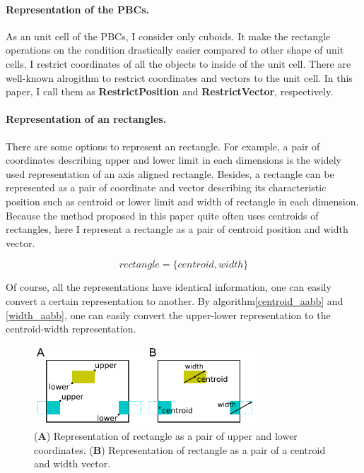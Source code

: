 \documentclass[10pt,letterpaper,twocolumn]{article}
\begin{document}
\paragraph{Representation of the PBCs.}
As an unit cell of the PBCs, I consider only cuboids.
It make the rectangle operations on the condition drastically easier compared to
other shape of unit cells.
I restrict coordinates of all the objects to inside of the unit cell.
There are well-known alrogithm to restrict coordinates and vectors to the unit
cell. In this paper, I call them as \textbf{RestrictPosition} and
\textbf{RestrictVector}, respectively.

\paragraph{Representation of an rectangles.}
There are some options to represent an rectangle.
For example, a pair of coordinates describing upper and lower limit in each
dimensions is the widely used representation of an axis aligned rectangle.
Besides, a rectangle can be represented as a pair of coordinate and
vector describing its characteristic position such as centroid or lower limit
and width of rectangle in each dimension.
Because the method proposed in this paper quite often uses centroids of
rectangles, here I represent a rectangle as a pair of centroid position and
width vector.

\begin{equation}
    rectangle = \{centroid, width\}
\end{equation}

Of course, all the representations have identical information, one can easily
convert a certain representation to another. By algorithm\ref{centroid_aabb} and
\ref{width_aabb}, one can easily convert the upper-lower representation to
the centroid-width representation.

\begin{figure}[hbt]
    \includegraphics[width=8.4cm, bb=3 2 233 83]{fig3.eps}
    \caption{
    (\textbf{A})
    Representation of rectangle as a pair of upper and lower coordinates.
    (\textbf{B})
    Representation of rectangle as a pair of a centroid and width vector.
    }
    \label{fig-rectangle-rep}
\end{figure}
\end{document}
